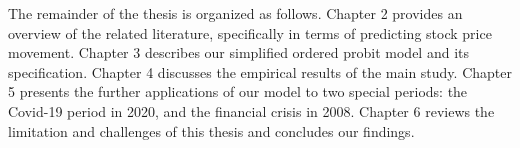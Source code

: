 {}


The remainder of the thesis is organized as follows. Chapter 2 provides an overview of the related literature, specifically in terms of predicting stock price movement. Chapter 3 describes our simplified ordered probit model and its specification. Chapter 4 discusses the empirical results of the main study. Chapter 5 presents the further applications of our model to two special periods: the Covid-19 period in 2020, and the financial crisis in 2008. Chapter 6 reviews the limitation and challenges of this thesis and concludes our findings.